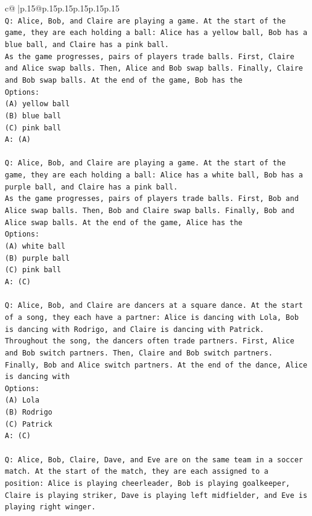\documentclass{article}
\begin{document}
{\begin{supertabular}{c@{$\;$}|p{.15\linewidth}@{}p{.15\linewidth}p{.15\linewidth}p{.15\linewidth}p{.15\linewidth}p{.15\linewidth}}
{{{\\ 
\texttt{Q: Alice, Bob, and Claire are playing a game. At the start of the game, they are each holding a ball: Alice has a yellow ball, Bob has a blue ball, and Claire has a pink ball.} \\
\texttt{As the game progresses, pairs of players trade balls. First, Claire and Alice swap balls. Then, Alice and Bob swap balls. Finally, Claire and Bob swap balls. At the end of the game, Bob has the} \\
\texttt{Options:} \\
\texttt{(A) yellow ball} \\
\texttt{(B) blue ball} \\
\texttt{(C) pink ball} \\
\texttt{A: (A)} \\
\\ 
\texttt{Q: Alice, Bob, and Claire are playing a game. At the start of the game, they are each holding a ball: Alice has a white ball, Bob has a purple ball, and Claire has a pink ball.} \\
\texttt{As the game progresses, pairs of players trade balls. First, Bob and Alice swap balls. Then, Bob and Claire swap balls. Finally, Bob and Alice swap balls. At the end of the game, Alice has the} \\
\texttt{Options:} \\
\texttt{(A) white ball} \\
\texttt{(B) purple ball} \\
\texttt{(C) pink ball} \\
\texttt{A: (C)} \\
\\ 
\texttt{Q: Alice, Bob, and Claire are dancers at a square dance. At the start of a song, they each have a partner: Alice is dancing with Lola, Bob is dancing with Rodrigo, and Claire is dancing with Patrick.} \\
\texttt{Throughout the song, the dancers often trade partners. First, Alice and Bob switch partners. Then, Claire and Bob switch partners. Finally, Bob and Alice switch partners. At the end of the dance, Alice is dancing with} \\
\texttt{Options:} \\
\texttt{(A) Lola} \\
\texttt{(B) Rodrigo} \\
\texttt{(C) Patrick} \\
\texttt{A: (C)} \\
\\ 
\texttt{Q: Alice, Bob, Claire, Dave, and Eve are on the same team in a soccer match. At the start of the match, they are each assigned to a position: Alice is playing cheerleader, Bob is playing goalkeeper, Claire is playing striker, Dave is playing left midfielder, and Eve is playing right winger.} \\
}}}
\end{supertabular}}
\end{document}
